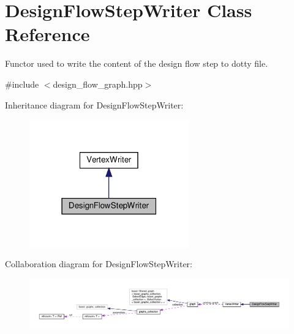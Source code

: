 \hypertarget{classDesignFlowStepWriter}{}\section{Design\+Flow\+Step\+Writer Class Reference}
\label{classDesignFlowStepWriter}


Functor used to write the content of the design flow step to dotty file.  




{\ttfamily \#include $<$design\+\_\+flow\+\_\+graph.\+hpp$>$}



Inheritance diagram for Design\+Flow\+Step\+Writer\+:
\nopagebreak
\begin{figure}[H]
\begin{center}
\leavevmode
\includegraphics[width=195pt]{dd/d88/classDesignFlowStepWriter__inherit__graph}
\end{center}
\end{figure}


Collaboration diagram for Design\+Flow\+Step\+Writer\+:
\nopagebreak
\begin{figure}[H]
\begin{center}
\leavevmode
\includegraphics[width=350pt]{d5/d9c/classDesignFlowStepWriter__coll__graph}
\end{center}
\end{figure}
